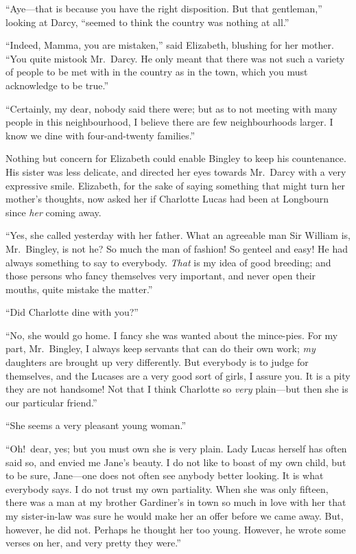 \documentclass[12pt,english]{book}
\begin{document}
{}``Aye\mbox{---}that is because you have the right disposition.
But that gentleman,'' looking at Darcy, {}``seemed to think the
country was nothing at all.''

{}``Indeed, Mamma, you are mistaken,'' said Elizabeth, blushing
for her mother. {}``You quite mistook Mr.\ Darcy. He only meant
that there was not such a variety of people to be met with in the
country as in the town, which you must acknowledge to be true.''

{}``Certainly, my dear, nobody said there were; but as to not meeting
with many people in this neighbourhood, I believe there are few neighbourhoods
larger. I know we dine with four-and-twenty families.''

Nothing but concern for Elizabeth could enable Bingley to keep his
countenance. His sister was less delicate, and directed her eyes towards
Mr.\ Darcy with a very expressive smile. Elizabeth, for the sake
of saying something that might turn her mother's thoughts, now asked
her if Charlotte Lucas had been at Longbourn since \textit{her} coming
away.

{}``Yes, she called yesterday with her father. What an agreeable
man Sir William is, Mr.\ Bingley, is not he? So much the man of fashion!
So genteel and easy! He had always something to say to everybody.
\textit{That} is my idea of good breeding; and those persons who fancy
themselves very important, and never open their mouths, quite mistake
the matter.''

{}``Did Charlotte dine with you?''\ 

{}``No, she would go home. I fancy she was wanted about the mince-pies.
For my part, Mr.\ Bingley, I always keep servants that can do their
own work; \textit{my} daughters are brought up very differently. But
everybody is to judge for themselves, and the Lucases are a very good
sort of girls, I assure you. It is a pity they are not handsome! Not
that I think Charlotte so \textit{very} plain\mbox{---}but then she
is our particular friend.''

{}``She seems a very pleasant young woman.''

{}``Oh!\ dear, yes; but you must own she is very plain. Lady Lucas
herself has often said so, and envied me Jane's beauty. I do not like
to boast of my own child, but to be sure, Jane\mbox{---}one does
not often see anybody better looking. It is what everybody says. I
do not trust my own partiality. When she was only fifteen, there was
a man at my brother Gardiner's in town so much in love with her that
my sister-in-law was sure he would make her an offer before we came
away. But, however, he did not. Perhaps he thought her too young.
However, he wrote some verses on her, and very pretty they were.''
\end{document}
